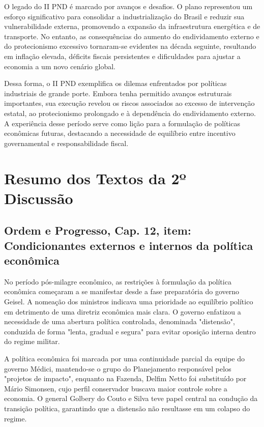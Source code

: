 \documentclass[a4paper,12pt]{article}[abntex2]
\begin{document}
O legado do II PND é marcado por avanços e desafios. O plano representou um esforço significativo para consolidar a industrialização do Brasil e reduzir sua vulnerabilidade externa, promovendo a expansão da infraestrutura energética e de transporte. No entanto, as consequências do aumento do endividamento externo e do protecionismo excessivo tornaram-se evidentes na década seguinte, resultando em inflação elevada, déficits fiscais persistentes e dificuldades para ajustar a economia a um novo cenário global.

Dessa forma, o II PND exemplifica os dilemas enfrentados por políticas industriais de grande porte. Embora tenha permitido avanços estruturais importantes, sua execução revelou os riscos associados ao excesso de intervenção estatal, ao protecionismo prolongado e à dependência do endividamento externo. A experiência desse período serve como lição para a formulação de políticas econômicas futuras, destacando a necessidade de equilíbrio entre incentivo governamental e responsabilidade fiscal.
\newpage

\section{\textbf{Resumo dos Textos da 2º Discussão}}
\subsection{\textbf{Ordem e Progresso, Cap. 12, item: Condicionantes externos e internos da política econômica}}

No período pós-milagre econômico, as restrições à formulação da política econômica começaram a se manifestar desde a fase preparatória do governo Geisel. A nomeação dos ministros indicava uma prioridade ao equilíbrio político em detrimento de uma diretriz econômica mais clara. O governo enfatizou a necessidade de uma abertura política controlada, denominada "distensão", conduzida de forma "lenta, gradual e segura" para evitar oposição interna dentro do regime militar.

A política econômica foi marcada por uma continuidade parcial da equipe do governo Médici, mantendo-se o grupo do Planejamento responsável pelos "projetos de impacto", enquanto na Fazenda, Delfim Netto foi substituído por Mário Simonsen, cujo perfil conservador buscava maior controle sobre a economia. O general Golbery do Couto e Silva teve papel central na condução da transição política, garantindo que a distensão não resultasse em um colapso do regime.
\end{document}
